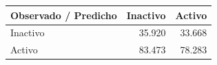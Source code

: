 \begin{tabular}{lrr}
\toprule
Observado / Predicho & Inactivo & Activo \\
\midrule
Inactivo & 35.920 & 33.668 \\
Activo & 83.473 & 78.283 \\
\bottomrule
\end{tabular}
